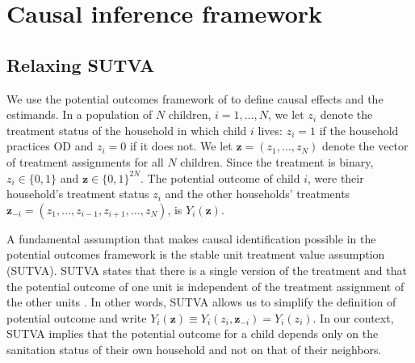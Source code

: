 \documentclass[12pt,a4paper,titlepage]{article}
\begin{document}


\section{Causal inference framework}\label{sec:framework}
\subsection{Relaxing SUTVA}
We use the potential outcomes framework of \cite{rubin1978} to define causal effects and the estimands. In a population of $N$ children, $i = 1, \ldots, N$, we let $z_i$ denote the treatment status of the household in which child $i$ lives: $z_i = 1$ if the household practices OD and $z_i = 0$ if it does not. We let $\mathbf{z} = (z_1, \ldots, z_N)$ denote the vector of treatment assignments for all $N$ children. Since the treatment is binary, $z_i \in \{0, 1\}$ and $\mathbf{z} \in \{0, 1\}^{2N}$. The potential outcome of child $i$, were their household's treatment status $z_i$ and the other households' treatments $\mathbf{z}_{-i} = (z_1, \ldots, z_{i-1}, z_{i+1}, \ldots, z_N)$, is $Y_i(\mathbf{z})$.

A fundamental assumption that makes causal identification possible in the potential outcomes framework is the stable unit treatment value assumption (SUTVA). SUTVA states that there is a single version of the treatment and that the potential outcome of one unit is independent of the treatment assignment of the other units \citep{rubin1986}. In other words, SUTVA allows us to simplify the definition of potential outcome and write $Y_i(\mathbf{z}) \equiv Y_i(z_i, \mathbf{z}_{-i}) = Y_i(z_i)$. In our context, SUTVA implies that the potential outcome for a child depends only on the sanitation status of their own household and not on that of their neighbors.
\end{document}
